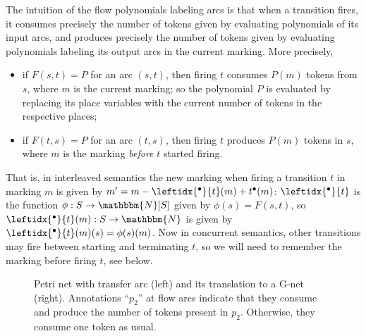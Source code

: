 \documentclass[runningheads,envcountsame]{llncs}
\newcommand*\Nat{\mathbbm{N}}
\newcommand*\prepla[1]{\leftidx{^\bullet}{#1}}
\newcommand*\pospla[1]{#1^\bullet}
\begin{document}
The intuition of the flow polynomials labeling arcs is that when a transition fires, it consumes precisely the number of tokens given by evaluating polynomials of its input arcs, and produces precisely the number of tokens given by evaluating polynomials labeling its output arcs in the current marking.
More precisely,
\begin{itemize}[noitemsep,topsep=0pt]
\item if $F(s, t)=P$ for an arc $(s, t)$, then firing $t$ consumes $P(m)$ tokens from $s$,
  where $m$ is the current marking;
  so the polynomial $P$ is evaluated by replacing its place variables
  with the current number of tokens in the respective places;
\item if $F(t, s)=P$ for an arc $(t, s)$, then firing $t$ produces $P(m)$ tokens in $s$,
  where $m$ is the marking \emph{before} $t$ started firing.
\end{itemize}
That is, in interleaved semantics the new marking when firing a transition $t$ in marking $m$
is given by $m'=m-\prepla{t}(m)+\pospla{t}(m)$:
$\prepla{t}$ is the function $\phi: S\to \Nat[S]$ given by $\phi(s)=F(s,t)$,
so $\prepla{t}(m): S\to \Nat$ is given by $\prepla{t}(m)(s)=\phi(s)(m)$.
Now in concurrent semantics,
other transitions may fire between starting and terminating $t$,
so we will need to remember the marking before firing $t$, see below.

\begin{figure}[tbp]
  \centering
  \caption{%
    Petri net with transfer arc (left) and its translation to a G-net (right).
    Annotations ``$p_2$'' at flow arcs
    indicate that they consume and produce the number of tokens present in $p_2$. Otherwise, they consume one token as usual.}
  \label{fi:gnet}
\end{figure}
\end{document}
